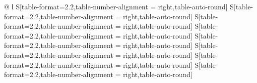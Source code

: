 \begin{table*}[tb]
 \centering
 \caption{%
  Full extents at
  half maximum of
  the \aclp{TPSF}
  \eqref{eqn:cs_math_tpsf} associated with
  the sensing matrices
  \eqref{eqn:recovery_reg_sensing_matrix} induced by
  all incident waves.
  They were evaluated for
  nine uniformly distributed normalized spatial frequencies along
  the semicircle with
  the center
  $\hat{\vect{K}}_{ \text{c} } = \trans{ ( 0, 25 ) } / 128$ and
  the radius
  $\hat{K}_{ \text{r} } = 101 / 512$ and numbered from
  \numrange{1}{9} with
  increasing polar angle.
 }
 \label{tab:sim_study_obj_B_sr_1_tpsf_fehm}
 \begin{tabular}{%
  @{}%
  l%
  S[table-format=2.2,table-number-alignment = right,table-auto-round]%
  S[table-format=2.2,table-number-alignment = right,table-auto-round]%
  S[table-format=2.2,table-number-alignment = right,table-auto-round]%
  S[table-format=2.2,table-number-alignment = right,table-auto-round]%
  S[table-format=2.2,table-number-alignment = right,table-auto-round]%
  S[table-format=2.2,table-number-alignment = right,table-auto-round]%
  S[table-format=2.2,table-number-alignment = right,table-auto-round]%
  S[table-format=2.2,table-number-alignment = right,table-auto-round]%
}
\end{tabular}
\end{table*}

